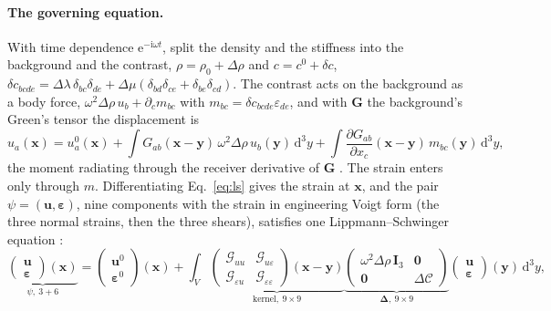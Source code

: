 \documentclass[11pt,a4paper]{article}
\newcommand{\bG}{\mathbf{G}}
\newcommand{\bI}{\mathbf{I}}
\newcommand{\bx}{\mathbf{x}}
\newcommand{\by}{\mathbf{y}}
\newcommand{\bD}{\boldsymbol{\Delta}}
\newcommand{\dd}{\mathrm{d}}
\begin{document}
\paragraph{The governing equation.} With time dependence $\mathrm e^{-\mathrm i\omega t}$, split the
density and the stiffness into the background and the contrast, $\rho=\rho_0+\Delta\rho$ and
$c=c^0+\delta c$, $\delta c_{bcde}=\Delta\lambda\,\delta_{bc}\delta_{de}
+\Delta\mu(\delta_{bd}\delta_{ce}+\delta_{be}\delta_{cd})$. The contrast acts on the background as a body
force, $\omega^2\Delta\rho\,u_b+\partial_cm_{bc}$ with $m_{bc}=\delta c_{bcde}\varepsilon_{de}$, and with
$\bG$ the background's Green's tensor the displacement is
\begin{equation}\label{eq:ls}
  u_a(\bx)=u^0_a(\bx)+\int G_{ab}(\bx-\by)\,\omega^2\Delta\rho\,u_b(\by)\,\dd^3y
  +\int\frac{\partial G_{ab}}{\partial x_c}(\bx-\by)\,m_{bc}(\by)\,\dd^3y ,
\end{equation}
the moment radiating through the receiver derivative of $\bG$ \citep{NestorError2026}. The strain
enters only through $m$. Differentiating Eq.~\eqref{eq:ls} gives the strain at $\bx$, and the pair
$\psi=(\mathbf u,\boldsymbol\varepsilon)$, nine components with the strain in engineering Voigt form
(the three normal strains, then the three shears), satisfies one Lippmann--Schwinger equation
\citep{NestorError2026}:
\begin{equation}\label{eq:ls9}
  \underbrace{\begin{pmatrix}\mathbf u\\[1pt]\boldsymbol\varepsilon\end{pmatrix}\!(\bx)}_{\psi,\ 3+6}
  =\begin{pmatrix}\mathbf u^0\\[1pt]\boldsymbol\varepsilon^0\end{pmatrix}\!(\bx)
  +\int_V
  \underbrace{\begin{pmatrix}\mathcal G_{uu}&\mathcal G_{u\varepsilon}\\[1pt]
    \mathcal G_{\varepsilon u}&\mathcal G_{\varepsilon\varepsilon}\end{pmatrix}\!(\bx-\by)}_{\text{kernel},\ 9\times9}
  \underbrace{\begin{pmatrix}\omega^2\Delta\rho\,\bI_3&\mathbf 0\\[1pt]
    \mathbf 0&\Delta\mathcal C\end{pmatrix}}_{\bD,\ 9\times9}
  \begin{pmatrix}\mathbf u\\[1pt]\boldsymbol\varepsilon\end{pmatrix}\!(\by)\,\dd^3y ,
\end{equation}
\end{document}
